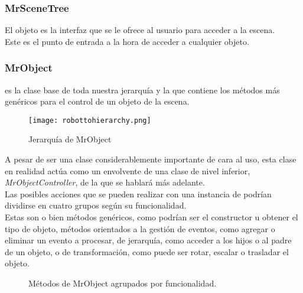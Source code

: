 \subsubsection{MrSceneTree}\label{susec:MrSceneTree}
El objeto \rorefscenetree es la interfaz que se le ofrece al usuario para acceder a la escena.\\
Este es el punto de entrada a la hora de acceder a cualquier objeto.


\subsubsection{MrObject}
\rorefobject\label{ro:object} es la clase base de toda nuestra jerarquía y la que contiene los métodos más genéricos para el control de un objeto de la escena.\\
\begin{figure}[h!]
\begin{center}
\texttt{[image: robottohierarchy.png]}
\end{center}
\caption[Jerarquía de MrObject]{Jerarquía de MrObject}
\label{fig:robottohierarchy}
\end{figure}
A pesar de ser una clase considerablemente importante de cara al uso, esta clase en realidad actúa como un envolvente de una clase de nivel inferior, \textit{MrObjectController}, de la que se hablará más adelante.\\

Las posibles acciones que se pueden realizar con una instancia de \rorefobject podrían dividirse en cuatro grupos según su funcionalidad.\\
Estas son o bien métodos genéricos, como podrían ser el constructor u obtener el tipo de objeto, métodos orientados a la gestión de eventos, como agregar o eliminar un evento a procesar, de jerarquía, como acceder a los hijos o al padre de un objeto, o de transformación, como puede ser rotar, escalar o trasladar el objeto.\\

\begin{figure}[h!]
\centering
{}
\hspace{0mm}
\caption[Métodos de MrObject]{Métodos de MrObject agrupados por funcionalidad.}
\label{fig:metodosmrobject}
\end{figure}

